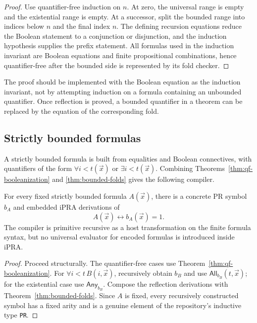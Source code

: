 \begin{proof}
Use quantifier-free induction on \(n\).  At zero, the universal range is empty
and the existential range is empty.  At a successor, split the bounded range
into indices below \(n\) and the final index \(n\).  The defining recursion
equations reduce the Boolean statement to a conjunction or disjunction, and
the induction hypothesis supplies the prefix statement.  All formulas used in
the induction invariant are Boolean equations and finite propositional
combinations, hence quantifier-free after the bounded side is represented by
its fold checker.
\end{proof}

The proof should be implemented with the Boolean equation as the induction
invariant, not by attempting induction on a formula containing an unbounded
quantifier.  Once reflection is proved, a bounded quantifier in a theorem can
be replaced by the equation of the corresponding fold.

\subsection{Strictly bounded formulas}

A strictly bounded formula is built from equalities and Boolean connectives,
with quantifiers of the form \(\forall i<t(\vec x)\) or
\(\exists i<t(\vec x)\).  Combining Theorems~\ref{thm:qf-booleanization} and
\ref{thm:bounded-folds} gives the following compiler.

\begin{theorem}
\label{thm:bounded-booleanization}
For every fixed strictly bounded formula \(A(\vec x)\), there is a concrete PR
symbol \(b_A\) and embedded iPRA derivations of
\[
   A(\vec x)\leftrightarrow b_A(\vec x)=1.
\]
The compiler is primitive recursive as a host transformation on the finite
formula syntax, but no universal evaluator for encoded formulas is introduced
inside iPRA.
\end{theorem}

\begin{proof}
Proceed structurally.  The quantifier-free cases use
Theorem~\ref{thm:qf-booleanization}.  For
\(\forall i<t\,B(i,\vec x)\), recursively obtain \(b_B\) and use
\(\mathsf{All}_{b_B}(t,\vec x)\); for the existential case use
\(\mathsf{Any}_{b_B}\).  Compose the reflection derivations with
Theorem~\ref{thm:bounded-folds}.  Since \(A\) is fixed, every recursively
constructed symbol has a fixed arity and is a genuine element of the
repository's inductive type \texttt{PR}.
\end{proof}


